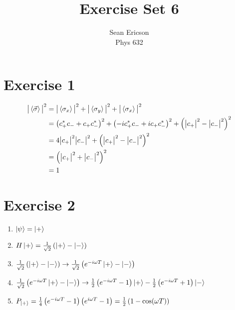\documentclass[12pt]{article}
\newcommand{\magsq}[1]{\big|#1\big|^2}
\begin{document}
	
\title{Exercise Set 6}
\author{Sean Ericson \\ Phys 632}
\maketitle

\section*{Exercise 1}
\begin{align*}
    \magsq{\ev{\vec{\sigma}}} &= \magsq{\ev{\sigma_x}} + \magsq{\ev{\sigma_y}} + \magsq{\ev{\sigma_x}} \\
    &= \left(c_+^* c_- + c_+ c_-^*\right)^2 + \left(-ic_+^* c_- +ic_+ c_-^*\right)^2 + \left(\magsq{c_+}-\magsq{c_-}\right)^2 \\
    &= 4\magsq{c_+}\magsq{c_-} + \left(\magsq{c_+}-\magsq{c_-}\right)^2 \\
    &= \left(\magsq{c_+} + \magsq{c_-}\right)^2 \\
    &= 1
\end{align*}

\section*{Exercise 2}
\begin{enumerate}
    \item $\ket{\psi} = \ket{+}$
    \item $H\ket{+} = \frac{1}{\sqrt{2}}\left(\ket{+} - \ket{-}\right)$
    \item $\frac{1}{\sqrt{2}}\left(\ket{+} - \ket{-}\right) \to \frac{1}{\sqrt{2}}\left(e^{-i\omega T}\ket{+} - \ket{-}\right)$
    \item $\frac{1}{\sqrt{2}}\left(e^{-i\omega T}\ket{+} - \ket{-}\right) \to \frac{1}{2}\left(e^{-i\omega T} - 1\right)\ket{+} - \frac{1}{2}\left(e^{-i\omega T} + 1\right)\ket{-}$
    \item $P_{\ket{+}} = \frac{1}{4}\left(e^{-i\omega T} - 1\right) \left(e^{i\omega T} - 1\right) = \frac{1}{2}\left(1 - \cos(\omega T)\right)$
\end{enumerate}
\end{document}
